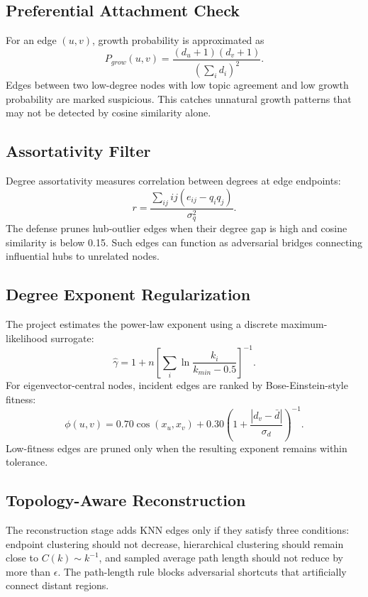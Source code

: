 \documentclass[12pt,oneside]{report}
\begin{document}
\subsection{Preferential Attachment Check}
For an edge \((u,v)\), growth probability is approximated as
\begin{equation}
P_{grow}(u,v)=\frac{(d_u+1)(d_v+1)}{\left(\sum_i d_i\right)^2}.
\end{equation}
Edges between two low-degree nodes with low topic agreement and low growth probability are marked suspicious. This catches unnatural growth patterns that may not be detected by cosine similarity alone.

\subsection{Assortativity Filter}
Degree assortativity measures correlation between degrees at edge endpoints:
\begin{equation}
r=\frac{\sum_{ij}ij(e_{ij}-q_iq_j)}{\sigma_q^2}.
\end{equation}
The defense prunes hub-outlier edges when their degree gap is high and cosine similarity is below 0.15. Such edges can function as adversarial bridges connecting influential hubs to unrelated nodes.

\subsection{Degree Exponent Regularization}
The project estimates the power-law exponent using a discrete maximum-likelihood surrogate:
\begin{equation}
\hat{\gamma}=1+n\left[\sum_i \ln\frac{k_i}{k_{min}-0.5}\right]^{-1}.
\end{equation}
For eigenvector-central nodes, incident edges are ranked by Bose-Einstein-style fitness:
\begin{equation}
\phi(u,v)=0.70\cos(x_u,x_v)+0.30\left(1+\frac{|d_v-\bar{d}|}{\sigma_d}\right)^{-1}.
\end{equation}
Low-fitness edges are pruned only when the resulting exponent remains within tolerance.

\subsection{Topology-Aware Reconstruction}
The reconstruction stage adds KNN edges only if they satisfy three conditions: endpoint clustering should not decrease, hierarchical clustering should remain close to \(C(k)\sim k^{-1}\), and sampled average path length should not reduce by more than \(\epsilon\). The path-length rule blocks adversarial shortcuts that artificially connect distant regions.
\end{document}
